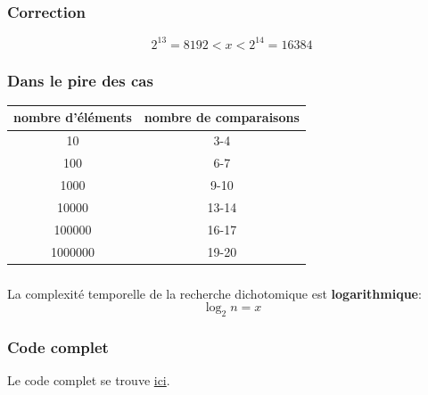 \documentclass[svgnames,11pt]{beamer}
\begin{document}
\begin{frame}
    \frametitle{Correction}

    {\Large $$2^{13}=8192 < x < 2^{14}=16384$$}

\end{frame}
\begin{frame}
    \frametitle{Dans le pire des cas}

    \begin{center}
        \begin{tabular}{|c|c|}
            \hline
            nombre d'éléments&nombre de comparaisons\\
            \hline
            10&3-4\\
            100&6-7\\
            1000&9-10\\
            10000&13-14\\
            100000&16-17\\
            1000000&19-20\\
            \hline
        \end{tabular}
    \end{center}

\end{frame}
\begin{frame}
    \frametitle{}

    \begin{aretenir}[]
        La complexité temporelle de la recherche dichotomique est \textbf{logarithmique}:
        {\Large$$ \log_2{n} =x$$}
        \end{aretenir}
\end{frame}
\begin{frame}
    \frametitle{Code complet}

    Le code complet se trouve \href{https://cviroulaud.github.io/premiere/algorithmique/recherche-dichotomique/scripts/dicho.zip}{ici}.

\end{frame}
\end{document}
